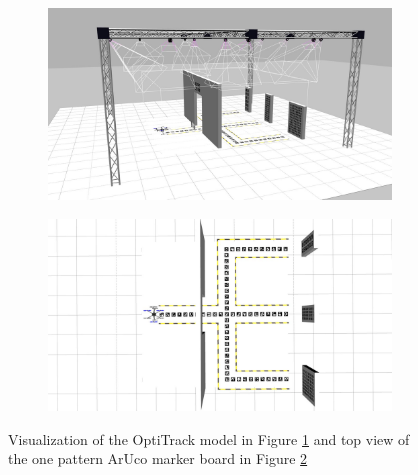 \documentclass[../Head/report.tex]{subfiles}
\begin{document}
\begin{figure}[H]
    \centering
    \begin{subfigure}[t]{.48\textwidth}
        \centering
        \includegraphics[width=\textwidth]{../Figures/3d-modeling/gazebo_one_pattern_view.jpg}
        \caption{}
        \label{fig:optitrack_one_pattern_aruco}
    \end{subfigure}
    \hfill
    \begin{subfigure}[t]{.48\textwidth}
        \centering
        \includegraphics[width=\textwidth]{../Figures/3d-modeling/gazebo_one_pattern.jpg}
        \caption{}
        \label{fig:one_pattern_aruco}
    \end{subfigure}
    \caption{Visualization of the OptiTrack model in Figure \ref{fig:optitrack_one_pattern_aruco} and top view of the one pattern ArUco marker board in Figure \ref{fig:one_pattern_aruco}}
    \label{fig:one_pattern_aruco_fig}
\end{figure}
\end{document}
